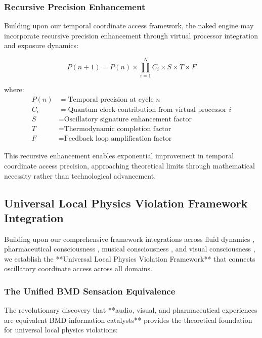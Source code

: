 \documentclass[11pt,a4paper]{article}
\theoremstyle{remark}
\begin{document}
\subsubsection{Recursive Precision Enhancement}

Building upon our temporal coordinate access framework, the naked engine may incorporate recursive precision enhancement through virtual processor integration and exposure dynamics:

\begin{equation}
P(n+1) = P(n) \times \prod_{i=1}^{N} C_i \times S \times T \times F
\end{equation}

where:
\begin{align}
P(n) &= \text{Temporal precision at cycle } n \\
C_i &= \text{Quantum clock contribution from virtual processor } i \\
S &= \text{Oscillatory signature enhancement factor} \\
T &= \text{Thermodynamic completion factor} \\
F &= \text{Feedback loop amplification factor}
\end{align}

This recursive enhancement enables exponential improvement in temporal coordinate access precision, approaching theoretical limits through mathematical necessity rather than technological advancement.

\subsection{Universal Local Physics Violation Framework Integration}

Building upon our comprehensive framework integrations across fluid dynamics \cite{sachikonye2024flux}, pharmaceutical consciousness \cite{sachikonye2024pharma}, musical consciousness \cite{sachikonye2024music}, and visual consciousness \cite{sachikonye2024vision}, we establish the **Universal Local Physics Violation Framework** that connects oscillatory coordinate access across all domains.

\subsubsection{The Unified BMD Sensation Equivalence}

The revolutionary discovery that **audio, visual, and pharmaceutical experiences are equivalent BMD information catalysts** provides the theoretical foundation for universal local physics violations:
\end{document}
